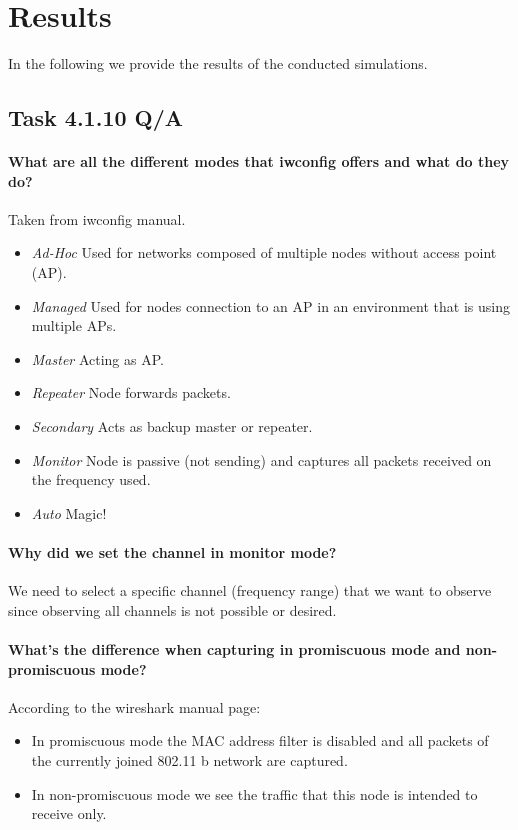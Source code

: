 \documentclass[12pt,a4paper]{article}
\begin{document}
\section{Results}
In the following we provide the results of the conducted simulations.
\subsection{Task 4.1.10 Q/A}

\paragraph{What are all the different modes that iwconfig offers and what do they do?}
Taken from iwconfig manual\cite{iwconfig:man}.
\begin{itemize}
	\item \emph{Ad-Hoc}
		Used for networks composed of multiple nodes without access point (AP).
	\item \emph{Managed}
		Used for nodes connection to an AP in an environment that is using multiple APs.
	\item \emph{Master}
		Acting as AP.
	\item \emph{Repeater}
		Node forwards packets.
	\item \emph{Secondary}
		Acts as backup master or repeater.
	\item \emph{Monitor}
		Node is passive (not sending) and captures all packets received on the frequency used.
	\item \emph{Auto}
		Magic!
\end{itemize}


\paragraph{Why did we set the channel in monitor mode?}
We need to select a specific channel (frequency range) that we want to observe since observing all channels is not possible or desired.

\paragraph{What's the difference when capturing in promiscuous mode and non-promiscuous mode?}
According to the wireshark manual page\cite{wireshark:man}:
\begin{itemize}
	\item In promiscuous mode the MAC address filter is disabled and all packets of the currently joined 802.11 b network are captured.

	\item In non-promiscuous mode we see the traffic that this node is intended to receive only.

\end{itemize}
\end{document}
